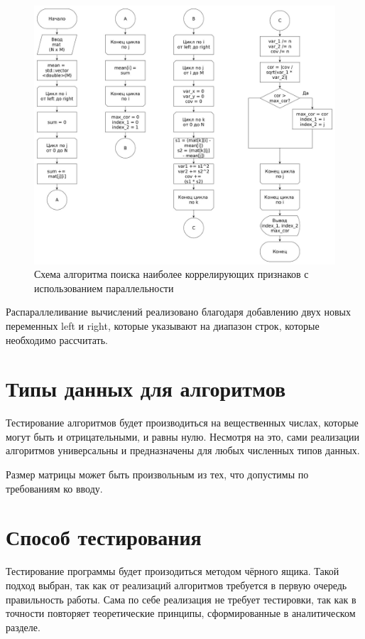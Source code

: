 \FloatBarrier
\begin{figure}[hp]
	\label{classic}
	\begin{center}
		\includegraphics[width=\linewidth]{graph/paral.jpg}
	\end{center}
	\caption{Схема алгоритма поиска наиболее коррелирующих признаков с использованием параллельности}
\end{figure}
\FloatBarrier

Распараллеливание вычислений реализовано благодаря добавлению двух новых переменных {\ttfamily left} и {\ttfamily right}, которые указывают на диапазон строк, которые необходимо рассчитать.


\section{Типы данных для алгоритмов}
Тестирование алгоритмов будет производиться на вещественных числах, 
которые могут быть и отрицательными, и равны нулю. Несмотря на это,
сами реализации алгоритмов универсальны и предназначены для любых численных типов данных.

Размер матрицы может быть произвольным из тех, что допустимы по требованиям ко вводу.

\section{Способ тестирования}
Тестирование программы будет произодиться методом чёрного ящика.
Такой подход выбран, так как от реализаций алгоритмов требуется в первую
очередь правильность работы.
Сама по себе реализация не требует тестировки, так как в точности
повторяет теоретические принципы, сформированные в аналитическом
разделе.

